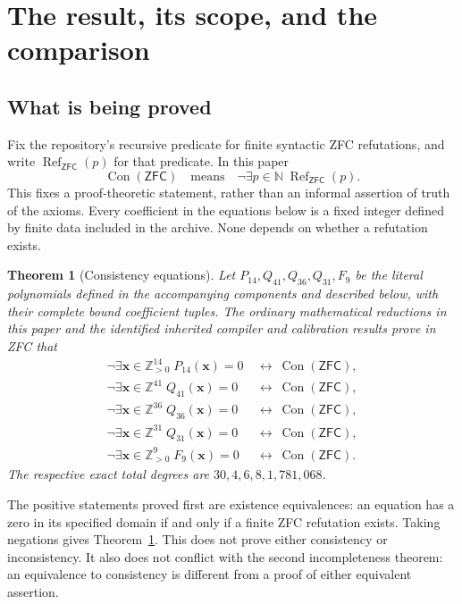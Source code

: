 \documentclass[11pt,a4paper]{article}
\newcommand{\Z}{\mathbb Z}
\newcommand{\N}{\mathbb N}
\newcommand{\Con}{\operatorname{Con}}
\newcommand{\ZFC}{\mathsf{ZFC}}
\newcommand{\ZFCRef}{\operatorname{Ref}_{\ZFC}}
\newtheorem{theorem}{Theorem}[section]
\theoremstyle{definition}
\theoremstyle{remark}
\begin{document}
\clearpage
\tableofcontents
\clearpage

\section{The result, its scope, and the comparison}
\label{sec:scope}

\subsection{What is being proved}

Fix the repository's recursive predicate for finite syntactic ZFC
refutations, and write $\ZFCRef(p)$ for that predicate.  In this paper
\[
\Con(\ZFC)\quad\text{means}\quad
\neg\exists p\in\N\;\ZFCRef(p).
\]
This fixes a proof-theoretic statement, rather than an informal assertion of
truth of the axioms.  Every coefficient in the equations below is a fixed
integer defined by finite data included in the archive.  None depends on
whether a refutation exists.

\begin{theorem}[Consistency equations]
\label{thm:main}
Let $P_{14},Q_{41},Q_{36},Q_{31},F_9$ be the literal polynomials defined in
the accompanying components and described below, with their complete bound
coefficient tuples.  The ordinary mathematical reductions in this paper and
the identified inherited compiler and calibration results prove in ZFC that
\begin{align*}
\neg\exists\mathbf x\in\Z_{>0}^{14}\;P_{14}(\mathbf x)=0
&\ \longleftrightarrow\ \Con(\ZFC),\\
\neg\exists\mathbf x\in\Z^{41}\;Q_{41}(\mathbf x)=0
&\ \longleftrightarrow\ \Con(\ZFC),\\
\neg\exists\mathbf x\in\Z^{36}\;Q_{36}(\mathbf x)=0
&\ \longleftrightarrow\ \Con(\ZFC),\\
\neg\exists\mathbf x\in\Z^{31}\;Q_{31}(\mathbf x)=0
&\ \longleftrightarrow\ \Con(\ZFC),\\
\neg\exists\mathbf x\in\Z_{>0}^{9}\;F_9(\mathbf x)=0
&\ \longleftrightarrow\ \Con(\ZFC).
\end{align*}
The respective exact total degrees are $30,4,6,8,1{,}781{,}068$.
\end{theorem}

The positive statements proved first are existence equivalences:
an equation has a zero in its specified domain if and only if a finite
ZFC refutation exists.  Taking negations gives Theorem~\ref{thm:main}.
This does not prove either consistency or inconsistency.  It also does not
conflict with the second incompleteness theorem: an equivalence to
consistency is different from a proof of either equivalent assertion.
\end{document}
